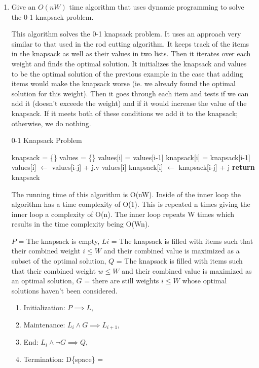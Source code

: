 \documentclass{article}
\begin{document}
\begin{enumerate}
    \item Give an $O(nW)$ time algorithm that uses dynamic programming to solve
        the 0-1 knapsack problem.
        
This algorithm solves the 0-1 knapsack problem. It uses an approach very similar to that used in the rod cutting algorithm. It keeps track of the items in the knapsack as well as their values in two lists. Then it iterates over each weight and finds the optimal solution. It initializes the knapsack and values to be the optimal solution of the previous example in the case that adding items would make the knapsack worse (ie. we already found the optimal solution for this weight). Then it goes through each item and tests if we can add it (doesn't exceede the weight) and if it would increase the value of the knapsack. If it meets both of these conditions we add it to the knapsack; otherwise, we do nothing.
        
\begin{algorithm}
    \caption{0-1 Knapsack Problem}\label{knap}
    \begin{algorithmic}[1]
      \State knapsack = \{\}
      \State values = \{\}
      	\State values[i] = values[i-1]
      	\State knapsack[i] = knapsack[i-1]
      			\State values[i] $\gets$ values[i-j] + j.v values[i]
      			\State knapsack[i] $\gets$ knapsack[i-j] + j
      		\EndIf
      	\EndFor
      \EndFor
      \State \textbf{return} knapsack
    \EndFunction
    \end{algorithmic}
\end{algorithm} 

The running time of this algorithm is O(nW). Inside of the inner loop the algorithm has a time complexity of O(1). This is repeated n times giving the inner loop a complexity of O(n). The inner loop repeats W times which results in the time complexity being O(Wn).

$P$ = The knapsack is empty, $Li$ = The knapsack is filled with items such that their combined weight $i \leq W$ and their combined value is maximized as a subset of the optimal solution, $Q$ = The knapsack is filled with items such that their combined weight $w \leq W$ and their combined value is maximized as an optimal solution, $G$ = there are still weights $i \leq W$ whose optimal solutions haven't been considered.
    \begin{enumerate}
        \item Initialization: $P \implies L$, 
        \item Maintenance: $L_{i} \land G \implies L_{i+1}$, 
        \item End: $L_{i} \land \neg G \implies Q$, 
        \item Termination: D\{space\} =  
    \end{enumerate}
        
\end{enumerate}
\end{document}
